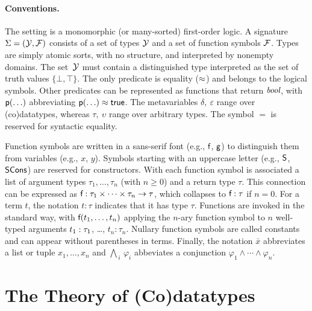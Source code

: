 \paragraph{Conventions.}
The setting is a monomorphic (or many-sorted) first-order logic.
A signature $\mathrm{\Sigma} = (\mathcal{Y}, \mathcal{F})$ consists of a set of types $\mathcal{Y}$ and a
set of function symbols $\mathcal{F}$. Types are simply atomic sorts, with no
structure, and interpreted by nonempty domains. The set~$\mathcal{Y}$ must contain a
distinguished type  interpreted as the set of truth
values $\{\bot, \top\}$. %
The only predicate is equality ($\approx$) and belongs to the logical symbols.
Other predicates can be represented as functions that return $\textit{bool}$,
with $\textsf{p}(\ldots)$ abbreviating $\textsf{p}(\ldots) \approx \textsf{true}$.
The metavariables $\delta,\:\varepsilon$ range over (co)datatypes,
whereas $\tau,\:\upsilon$ range over arbitrary types. The symbol $=$ is reserved
for syntactic equality.

Function symbols are written in a sans-serif font (e.g., $\textsf{f}$, $\textsf{g}$) to
distinguish them from variables (e.g., $x$, $y$). Symbols starting with an uppercase
letter (e.g.,
$\textsf{S}$, $\textsf{SCons}$) are reserved for constructors. With each function symbol 
is associated a list of argument types $\tau_1,\ldots,\tau_n$ (with $n \ge 0$)
and a return type $\tau$. This connection can be expressed %
as $\textsf{f} : \tau_1 \times \cdots \times \tau_n \to \tau$,
which collapses to $\textsf{f} : \tau$ if $n = 0$.
For a term $t$, the notation $t : \tau$ indicates that it has type $\tau$.
Functions are invoked in the standard way, with $\textsf{f}(t_1,\ldots,t_n)$
applying the $n$-ary function symbol
 to $n$ well-typed arguments $t_1 :\nobreak \tau_1$, \ldots, $t_n :
\tau_n$. Nullary function symbols are called constants and can appear without
parentheses in terms.
%
Finally, the notation $\bar x$ abbreviates a list or tuple $x_1,\ldots,x_n$
and $\bigwedge_{\,i}\, \varphi_i$ abbeviates a conjunction
$\varphi_1 \mathrel\land \cdots \mathrel\land \varphi_n$.


\section{The Theory of (Co)datatypes}
\label{sec:the-theory-of-co-datatypes}

